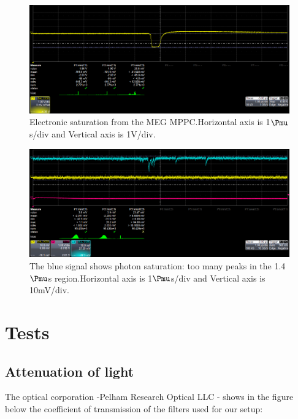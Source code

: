 \documentclass[a4paper, 11pt]{report}%
\begin{document}
  \begin{figure}[!hbtp]
  \centering  
    \includegraphics[totalheight=.2\textwidth,trim=0.3cm 6.6cm 0.1cm 0cm, clip=true]{../Pictures/Pictures_oscilloscope/saturation_1.png}
    \caption{Electronic saturation from the MEG MPPC.Horizontal axis is 1$\Pmu$s/div and Vertical axis is 1V/div.}
    \label{fig:elec_sat}
  \end{figure}
   
  \begin{figure}[!hbtp]
    \centering
    \includegraphics[totalheight=.2\textwidth,trim=0.3cm 6.6cm 0.1cm 0cm, clip=true]{../Pictures/Pictures_oscilloscope/light_region_2.png}
    \caption{The blue signal shows photon saturation: too many peaks in the 1.4$\Pmu$s region.Horizontal axis is 1$\Pmu$s/div and Vertical axis is 10mV/div.}
    \label{fig:photon_sat}
  \end{figure}

\chapter{Tests}\label{app:tests}

  \section{Attenuation of light}
  
  The optical corporation -Pelham Research Optical LLC - shows in the figure below the coefficient of transmission of the filters used 
  for our setup:
  
\end{document}
